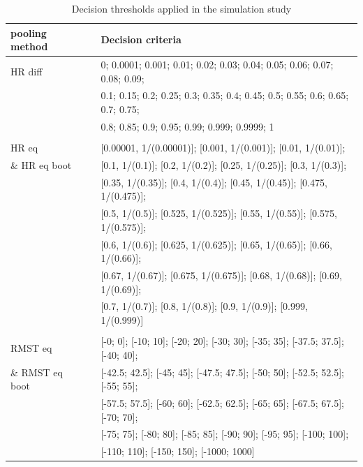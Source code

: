 \documentclass[Royal,sagev,times]{sagej}
\begin{document}
\begin{table}[H]
\caption{Decision thresholds applied in the simulation study \label{Table:DecisionCriteria}}
\begin{tabular}{lll}
\toprule
pooling method&&Decision criteria\\
\midrule
HR diff && 0; 0.0001; 0.001; 0.01; 0.02; 0.03; 0.04; 0.05; 0.06; 0.07; 0.08; 0.09;\\
&& 0.1; 0.15; 0.2; 0.25; 0.3; 0.35; 0.4; 0.45; 0.5; 0.55; 0.6; 0.65; 0.7; 0.75; \\
&& 0.8; 0.85; 0.9; 0.95; 0.99; 0.999; 0.9999; 1\\
&&\\
HR eq && [0.00001, 1/(0.00001)];
[0.001, 1/(0.001)];
[0.01, 1/(0.01)];\\
\& HR eq boot && 
[0.1, 1/(0.1)];
[0.2, 1/(0.2)];
[0.25, 1/(0.25)];
[0.3, 1/(0.3)];\\
&& 
[0.35, 1/(0.35)];
[0.4, 1/(0.4)];
[0.45, 1/(0.45)];
[0.475, 1/(0.475)];\\
&& 
[0.5, 1/(0.5)];
[0.525, 1/(0.525)];
[0.55, 1/(0.55)];
[0.575, 1/(0.575)];\\
&&
[0.6, 1/(0.6)];
[0.625, 1/(0.625)];
[0.65, 1/(0.65)];
[0.66, 1/(0.66)];\\
&&
[0.67, 1/(0.67)];
[0.675, 1/(0.675)];
[0.68, 1/(0.68)];
[0.69, 1/(0.69)];\\
&&
[0.7, 1/(0.7)];
[0.8, 1/(0.8)];
[0.9, 1/(0.9)];
[0.999, 1/(0.999)] \\

&& \\

RMST eq && [-0; 0];
[-10; 10];
[-20; 20];
[-30; 30];
[-35; 35];
[-37.5; 37.5];
[-40; 40];\\
\& RMST eq boot && [-42.5; 42.5];
[-45; 45];
[-47.5; 47.5];
[-50; 50];
[-52.5; 52.5];
[-55; 55]; \\
&& [-57.5; 57.5];
[-60; 60];
[-62.5; 62.5];
[-65; 65];
[-67.5; 67.5];
[-70; 70]; \\
&& [-75; 75];
[-80; 80];
[-85; 85];
[-90; 90];
[-95; 95];
[-100; 100];\\
&& [-110; 110];
[-150; 150];
[-1000; 1000]

\bottomrule
\end{tabular}\\[10pt]
\end{table}

\\
\end{document}
